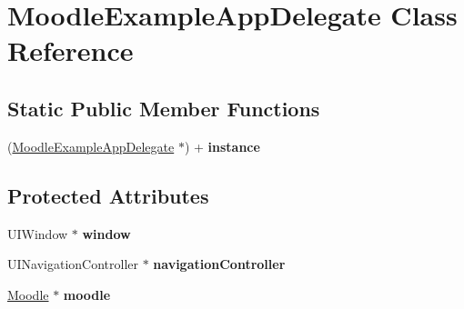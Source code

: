 \hypertarget{interface_moodle_example_app_delegate}{
\section{MoodleExampleAppDelegate Class Reference}
\label{interface_moodle_example_app_delegate}
}
\subsection*{Static Public Member Functions}
\begin{DoxyCompactItemize}
\item 
\hypertarget{interface_moodle_example_app_delegate_a3319c83321774cc454f300c79b4fc9d3}{
(\hyperlink{interface_moodle_example_app_delegate}{MoodleExampleAppDelegate} $\ast$) + {\bfseries instance}}
\label{interface_moodle_example_app_delegate_a3319c83321774cc454f300c79b4fc9d3}

\end{DoxyCompactItemize}
\subsection*{Protected Attributes}
\begin{DoxyCompactItemize}
\item 
\hypertarget{interface_moodle_example_app_delegate_aef4edbf2b477882112eb538418a146c8}{
UIWindow $\ast$ {\bfseries window}}
\label{interface_moodle_example_app_delegate_aef4edbf2b477882112eb538418a146c8}

\item 
\hypertarget{interface_moodle_example_app_delegate_a2520d3916816a72306c75e1b90552840}{
UINavigationController $\ast$ {\bfseries navigationController}}
\label{interface_moodle_example_app_delegate_a2520d3916816a72306c75e1b90552840}

\item 
\hypertarget{interface_moodle_example_app_delegate_a6727452af9fedd619be03774b0c4212d}{
\hyperlink{interface_moodle}{Moodle} $\ast$ {\bfseries moodle}}
\label{interface_moodle_example_app_delegate_a6727452af9fedd619be03774b0c4212d}

\end{DoxyCompactItemize}
